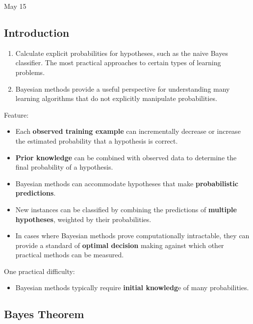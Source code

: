 \univlogo

{\Huge May 15}\vspace{5mm}

\hypertarget{introduction}{%
\subsection{Introduction}\label{introduction}}

\begin{enumerate}
\def\labelenumi{\arabic{enumi}.}
\item
  Calculate explicit probabilities for hypotheses, such as the naive
  Bayes classifier. The most practical approaches to certain types of
  learning problems.
\item
  Bayesian methods provide a useful perspective for understanding many
  learning algorithms that do not explicitly manipulate probabilities.
\end{enumerate}

Feature:

\begin{itemize}
\item
  Each \textbf{observed training example} can incrementally decrease or
  increase the estimated probability that a hypothesis is correct.
\item
  \textbf{Prior knowledge} can be combined with observed data to
  determine the final probability of a hypothesis.
\item
  Bayesian methods can accommodate hypotheses that make
  \textbf{probabilistic predictions}.
\item
  New instances can be classified by combining the predictions of
  \textbf{multiple hypotheses}, weighted by their probabilities.
\item
  In cases where Bayesian methods prove computationally intractable,
  they can provide a standard of \textbf{optimal decision} making
  against which other practical methods can be measured.
\end{itemize}

One practical difficulty:

\begin{itemize}
\item
  Bayesian methods typically require \textbf{initial knowledg}e of many
  probabilities.
\end{itemize}

\hypertarget{bayes-theorem}{%
\subsection{Bayes Theorem}\label{bayes-theorem}}

